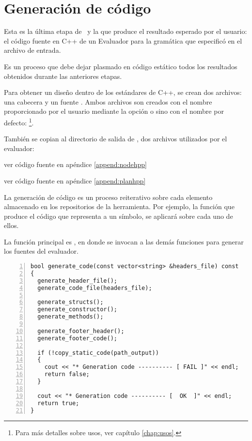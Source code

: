\section{Generación de código}

Esta es la última etapa de \maggen\ y la que produce el resultado esperado por el usuario: el código fuente en C++ de un Evaluador para la gramática que especificó en el archivo de entrada.

Es un proceso que debe dejar plasmado en código estático todos los resultados obtenidos durante las anteriores etapas.

Para obtener un diseño dentro de los estándares de C++, se crean dos archivos: una cabecera  y un fuente . Ambos archivos son creados con el nombre proporcionado por el usuario mediante la opción  o sino con el nombre por defecto: \footnote{Para más detalles sobre usos, ver capítulo \ref{chap:usos}.}.

También se copian al directorio de salida de \maggen, dos archivos utilizados por el evaluador:
\begin{items}
\item {} ver código fuente en apéndice \ref{append:nodehpp}
\item {} ver código fuente en apéndice \ref{append:planhpp}
\end{items}

\vspace*{0.2cm}

La generación de código es un proceso reiterativo sobre cada elemento almacenado en los repositorios de la herramienta. Por ejemplo, la función que produce el código que representa a un símbolo, se aplicará sobre cada uno de ellos.

La función principal es , en donde se invocan a las demás funciones para generar los fuentes del evaluador.

\begin{lstlisting}[numbers=left, columns=fullflexible, linewidth=11.5cm]
bool generate_code(const vector<string> &headers_file) const
{
  generate_header_file();
  generate_code_file(headers_file);

  generate_structs();
  generate_constructor();
  generate_methods();

  generate_footer_header();
  generate_footer_code();

  if (!copy_static_code(path_output))
  {
    cout << "* Generation code ---------- [ FAIL ]" << endl;
    return false;
  }

  cout << "* Generation code ---------- [  OK  ]" << endl;
  return true;
}
\end{lstlisting}

